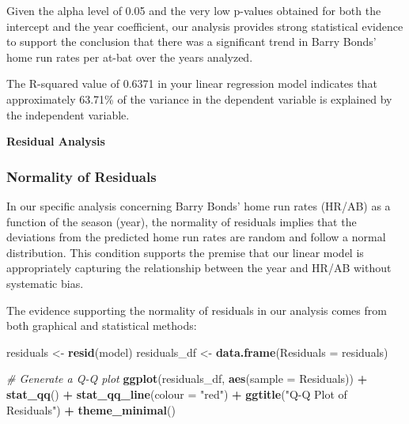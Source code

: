 \documentclass[
]{article}
\newenvironment{Shaded}{\begin{snugshade}}{\end{snugshade}}
\newcommand{\AttributeTok}[1]{\textcolor[rgb]{0.13,0.29,0.53}{#1}}
\newcommand{\CommentTok}[1]{\textcolor[rgb]{0.56,0.35,0.01}{\textit{#1}}}
\newcommand{\FunctionTok}[1]{\textcolor[rgb]{0.13,0.29,0.53}{\textbf{#1}}}
\newcommand{\NormalTok}[1]{#1}
\newcommand{\OtherTok}[1]{\textcolor[rgb]{0.56,0.35,0.01}{#1}}
\newcommand{\SpecialCharTok}[1]{\textcolor[rgb]{0.81,0.36,0.00}{\textbf{#1}}}
\newcommand{\StringTok}[1]{\textcolor[rgb]{0.31,0.60,0.02}{#1}}
\begin{document}
Given the alpha level of 0.05 and the very low p-values obtained for
both the intercept and the year coefficient, our analysis provides
strong statistical evidence to support the conclusion that there was a
significant trend in Barry Bonds' home run rates per at-bat over the
years analyzed.

The R-squared value of 0.6371 in your linear regression model indicates
that approximately 63.71\% of the variance in the dependent variable is
explained by the independent variable.

\textbf{Residual Analysis}

\hypertarget{normality-of-residuals}{%
\subsubsection{Normality of Residuals}\label{normality-of-residuals}}

In our specific analysis concerning Barry Bonds' home run rates (HR/AB)
as a function of the season (year), the normality of residuals implies
that the deviations from the predicted home run rates are random and
follow a normal distribution. This condition supports the premise that
our linear model is appropriately capturing the relationship between the
year and HR/AB without systematic bias.

The evidence supporting the normality of residuals in our analysis comes
from both graphical and statistical methods:

\begin{Shaded}
\begin{Highlighting}[]
\NormalTok{residuals }\OtherTok{\textless{}{-}} \FunctionTok{resid}\NormalTok{(model)}
\NormalTok{residuals\_df }\OtherTok{\textless{}{-}} \FunctionTok{data.frame}\NormalTok{(}\AttributeTok{Residuals =}\NormalTok{ residuals)}

\CommentTok{\# Generate a Q{-}Q plot}
\FunctionTok{ggplot}\NormalTok{(residuals\_df, }\FunctionTok{aes}\NormalTok{(}\AttributeTok{sample =}\NormalTok{ Residuals)) }\SpecialCharTok{+}
  \FunctionTok{stat\_qq}\NormalTok{() }\SpecialCharTok{+}
  \FunctionTok{stat\_qq\_line}\NormalTok{(}\AttributeTok{colour =} \StringTok{"red"}\NormalTok{) }\SpecialCharTok{+}
  \FunctionTok{ggtitle}\NormalTok{(}\StringTok{"Q{-}Q Plot of Residuals"}\NormalTok{) }\SpecialCharTok{+}
  \FunctionTok{theme\_minimal}\NormalTok{()}
\end{Highlighting}
\end{Shaded}
\end{document}
